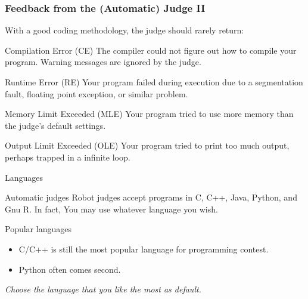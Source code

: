 \documentclass{beamer}
\begin{document}
\begin{frame}
  \frametitle{Feedback from the (Automatic) Judge II}
  With a good coding methodology, the judge should rarely return:
  \begin{block}{Compilation Error (CE)}
    The compiler could not figure out how to compile your program. Warning messages are ignored by the judge.
  \end{block}

  \begin{block}{Runtime Error (RE)}
    Your program failed during execution due to a segmentation fault, floating point exception, or similar problem.
  \end{block}

  \begin{block}{Memory Limit Exceeded (MLE)}
    Your program tried to use more memory than the judge’s default settings.
  \end{block}

  \begin{block}{Output Limit Exceeded (OLE)}
    Your program tried to print too much output, perhaps trapped in a infinite loop.
  \end{block}

\end{frame}


\begin{frame}{Languages}

  \begin{block}{Automatic judges}
      Robot judges accept programs in C, C++, Java, Python, and Gnu R. In fact, You may use whatever language you wish.
  \end{block}

  \begin{block}{Popular languages}
    \begin{itemize}
    \item C/C++ is still the most popular language for programming contest.
    \item Python often comes second.
    \end{itemize}
    \emph{Choose the language that you like the most as default.}
  \end{block}


  \end{frame}
\end{document}
